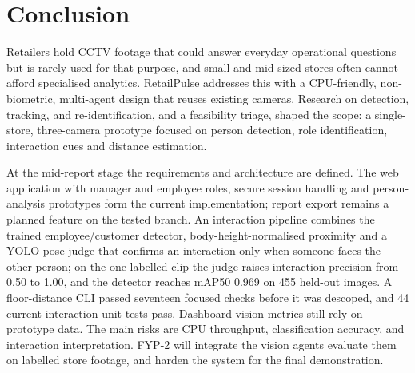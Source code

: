 \chapter{Conclusion}
Retailers hold CCTV footage that could answer everyday operational questions but is rarely used for that purpose, and small and mid-sized stores often cannot afford specialised analytics. RetailPulse addresses this with a CPU-friendly, non-biometric, multi-agent design that reuses existing cameras. Research on detection, tracking, and re-identification, and a feasibility triage, shaped the scope: a single-store, three-camera prototype focused on person detection, role identification, interaction cues and distance estimation.

At the mid-report stage the requirements and architecture are defined. The web application with manager and employee roles, secure session handling and person-analysis prototypes form the current implementation; report export remains a planned feature on the tested branch. An interaction pipeline combines the trained employee/customer detector, body-height-normalised proximity and a YOLO pose judge that confirms an interaction only when someone faces the other person; on the one labelled clip the judge raises interaction precision from 0.50 to 1.00, and the detector reaches mAP50 0.969 on 455 held-out images. A floor-distance CLI passed seventeen focused checks before it was descoped, and 44 current interaction unit tests pass. Dashboard vision metrics still rely on prototype data. The main risks are CPU throughput, classification accuracy, and interaction interpretation. FYP-2 will integrate the vision agents evaluate them on labelled store footage, and harden the system for the final demonstration.
